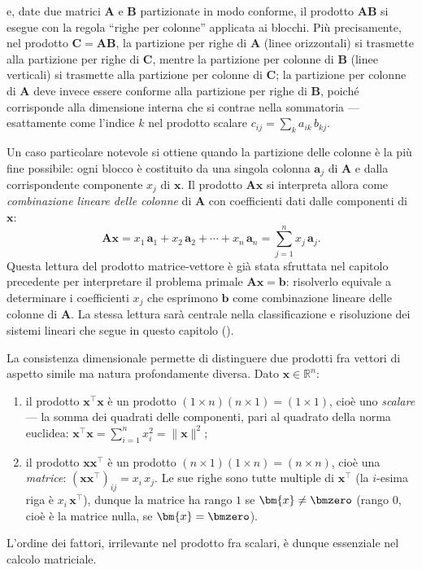 e, date due matrici $\bm{A}$ e $\bm{B}$ partizionate in modo conforme,
il prodotto $\bm{A}\bm{B}$ si esegue con la regola ``righe per colonne''
applicata ai blocchi. Pi\`u precisamente, nel prodotto
$\bm{C}=\bm{A}\bm{B}$, la partizione per righe di $\bm{A}$ (linee
orizzontali) si trasmette alla partizione per righe di $\bm{C}$, mentre
la partizione per colonne di $\bm{B}$ (linee verticali) si trasmette
alla partizione per colonne di $\bm{C}$; la partizione per colonne di
$\bm{A}$ deve invece essere conforme alla partizione per righe di
$\bm{B}$, poich\'e corrisponde alla dimensione interna che si contrae
nella sommatoria --- esattamente come l'indice $k$ nel prodotto scalare
$c_{ij}=\sum_k a_{ik}\,b_{kj}$.

Un caso particolare notevole si ottiene quando la partizione delle colonne
\`e la pi\`u fine possibile: ogni blocco \`e costituito da una singola colonna
$\bm{a}_j$ di $\bm{A}$ e dalla corrispondente componente $x_j$ di $\bm{x}$.
Il prodotto $\bm{A}\bm{x}$ si interpreta allora come \textit{combinazione
	lineare delle colonne} di $\bm{A}$ con coefficienti dati dalle componenti
di $\bm{x}$:
\begin{equation}\label{eq:comb_lin_colonne}
	\bm{A}\bm{x} = x_1\,\bm{a}_1 + x_2\,\bm{a}_2 + \cdots + x_n\,\bm{a}_n
	= \sum_{j=1}^{n} x_j\,\bm{a}_j.
\end{equation}
Questa lettura del prodotto matrice-vettore è già stata sfruttata nel capitolo precedente per interpretare il problema primale $\bm{A}\bm{x}=\bm{b}$: risolverlo equivale a determinare i coefficienti $x_j$ che esprimono $\bm{b}$ come combinazione lineare delle colonne di $\bm{A}$. La stessa lettura sarà centrale nella classificazione e risoluzione dei sistemi lineari che segue in questo capitolo ().

\begin{oss}
	La consistenza dimensionale permette di distinguere due prodotti
	fra vettori di aspetto simile ma natura profondamente diversa. Dato
	$\bm{x}\in\mathbb{R}^n$:
	\begin{enumerate}[label=(\roman*) ]
		\item il prodotto $\bm{x}^\top\bm{x}$ \`e un prodotto
		$(1\times n)(n\times 1) = (1\times 1)$, cio\`e uno
		\textit{scalare} --- la somma dei quadrati delle componenti,
		pari al quadrato della norma euclidea:
		$\bm{x}^\top\bm{x} = \sum_{i=1}^n x_i^2 = \|\bm{x}\|^2$;
		\item il prodotto $\bm{x}\bm{x}^\top$ \`e un prodotto
		$(n\times 1)(1\times n) = (n\times n)$, cio\`e una
		\textit{matrice}:
		$(\bm{x}\bm{x}^\top)_{ij} = x_i\, x_j$. Le sue righe sono
		tutte multiple di $\bm{x}^\top$ (la $i$-esima riga \`e
		$x_i\,\bm{x}^\top$), dunque la matrice ha rango $1$ se
		$\bm{x}\neq\bmzero$ (rango $0$, cio\`e \`e la matrice nulla,
		se $\bm{x}=\bmzero$).
	\end{enumerate}
	L'ordine dei fattori, irrilevante nel prodotto fra scalari,
	\`e dunque essenziale nel calcolo matriciale.
\end{oss}

